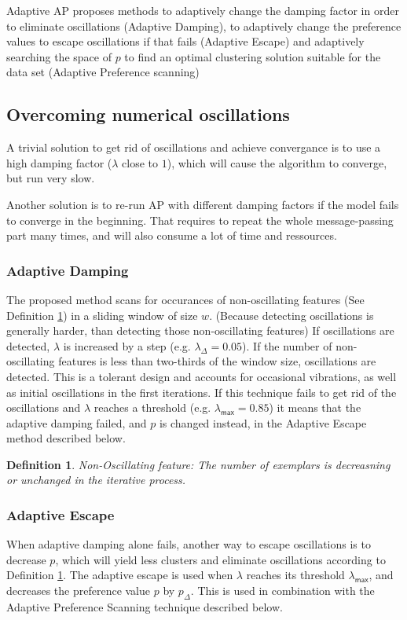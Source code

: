 \documentclass[11pt,a4paper]{article}
\newtheorem{definition}{Definition}
\begin{document}
Adaptive AP proposes methods to adaptively change the damping factor in order to eliminate oscillations (Adaptive Damping), to adaptively change the preference values to escape oscillations if that fails (Adaptive Escape) and adaptively searching the space of $p$ to find an optimal clustering solution suitable for the data set (Adaptive Preference scanning)
\subsection{Overcoming numerical oscillations}
A trivial solution to get rid of oscillations and achieve convergance is to use a high damping factor ($\lambda$ close to $1$), which will cause the algorithm to converge, but run very slow. \cite{wang2008adaptive}

Another solution is to re-run AP with different damping factors if the model fails to converge in the beginning. That requires to repeat the whole message-passing part many times, and will also consume a lot of time and ressources. \cite{wang2008adaptive}

\subsubsection{Adaptive Damping}
The proposed method scans for occurances of non-oscillating features (See Definition \ref{def:nonosc}) in a sliding window of size $w$. (Because detecting oscillations is generally harder, than detecting those non-oscillating features) If oscillations are detected, $\lambda$ is increased by a step (e.g. $\lambda_\Delta = 0.05$). If the number of non-oscillating features is less than two-thirds of the window size, oscillations are detected. This is a tolerant design and accounts for occasional vibrations, as well as initial oscillations in the first iterations. \cite{wang2008adaptive} If this technique fails to get rid of the oscillations and $\lambda$ reaches a threshold (e.g. $\lambda_{\mathsf{max}} = 0.85$) it means that the adaptive damping failed, and $p$ is changed instead, in the Adaptive Escape method described below.
\begin{definition}\label{def:nonosc}
	Non-Oscillating feature: The number of exemplars is decreasning or unchanged in the iterative process. \cite{wang2008adaptive}
\end{definition}
\subsubsection{Adaptive Escape}
When adaptive damping alone fails, another way to escape oscillations is to decrease $p$, which will yield less clusters and eliminate oscillations according to Definition \ref{def:nonosc}. The adaptive escape is used when $\lambda$ reaches its threshold $\lambda_{\mathsf{max}}$, and decreases the preference value $p$ by $p_{\Delta}$. \cite{wang2008adaptive} This is used in combination with the Adaptive Preference Scanning technique described below.
\end{document}
